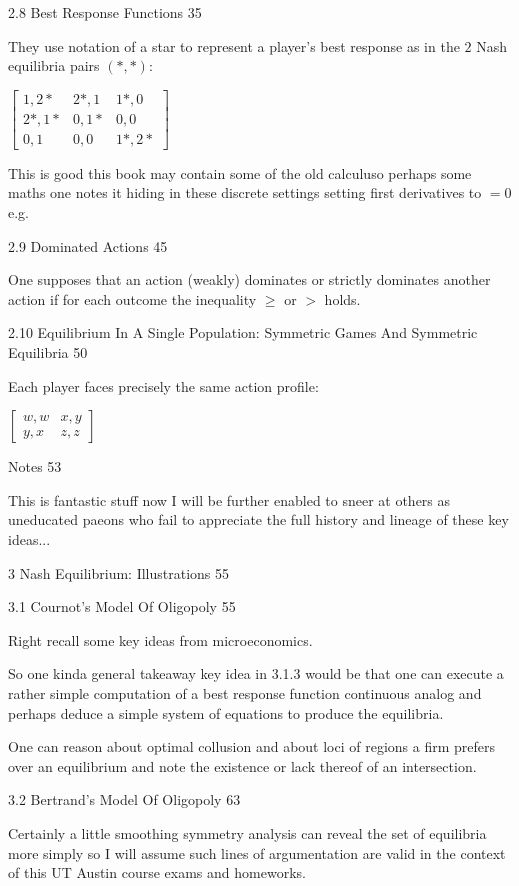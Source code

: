 2.8 Best Response Functions 35

They use notation of a star to represent a player's best response as in the $2$ Nash equilibria pairs $(*,*)$:

$
\begin{bmatrix}
1,2* & 2*,1 & 1*,0 \\
2*,1* & 0,1* & 0,0 \\
0,1 & 0,0 & 1*,2*
\end{bmatrix}
$

This is good this book may contain some of the old calculuso perhaps some maths one notes it hiding in these discrete settings setting first derivatives to $=0$ e.g.

2.9 Dominated Actions 45

One supposes that an action (weakly) dominates or strictly dominates another action if for each outcome the inequality $\ge$ or $>$ holds.

2.10 Equilibrium In A Single Population: Symmetric Games And Symmetric Equilibria 50

Each player faces precisely the same action profile:

$
\begin{bmatrix}
w,w & x,y \\
y,x & z,z
\end{bmatrix}
$

Notes 53

This is fantastic stuff now I will be further enabled to sneer at others as uneducated paeons who fail to appreciate the full history and lineage of these key ideas...

3 Nash Equilibrium: Illustrations 55



3.1 Cournot's Model Of Oligopoly 55

Right recall some key ideas from microeconomics.

So one kinda general takeaway key idea in 3.1.3 would be that one can execute a rather simple computation of a best response function continuous analog and perhaps deduce a simple system of equations to produce the equilibria.

One can reason about optimal collusion and about loci of regions a firm prefers over an equilibrium and note the existence or lack thereof of an intersection.

3.2 Bertrand's Model Of Oligopoly 63

Certainly a little smoothing symmetry analysis can reveal the set of equilibria more simply so I will assume such lines of argumentation are valid in the context of this UT Austin course exams and homeworks.

